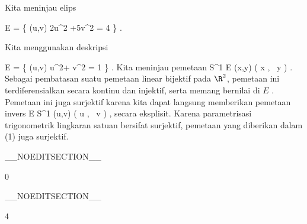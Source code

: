 {

Kita meninjau elips

\mavergleichskettedisp
{\vergleichskette
{ E
}
{ =} { \left\{ (u,v)  \mid   2u^2 +5v^2 = 4         \right\}
}
{ } {
}
{ } {
}
{ } {
}
}
{}{}{.}

}
{

Kita menggunakan deskripsi

\mavergleichskettedisp
{\vergleichskette
{ E
}
{ =} { \left\{ (u,v)   u^2+ {  } v^2 = 1         \right\}
}
{ } {
}
{ } {
}
{ } {
}
}
{}{}{.}
 {Kita meninjau pemetaan
\maabbeledisp {} {S^1} {E
} {(x,y)} { \left(   x  , \,   {  } y                   \right)
} {.}
Sebagai pembatasan suatu pemetaan linear bijektif pada $\R^2$, pemetaan ini terdiferensialkan secara kontinu dan injektif, serta memang bernilai di $E$
 {} {.}
Pemetaan ini juga surjektif karena kita dapat langsung memberikan pemetaan invers
\maabbeledisp {} { E } {S^1
} {(u,v)} { \left(  {  } u  , \,   {  } v                   \right)
} {,}
secara eksplisit. Karena parametrisasi trigonometrik lingkaran satuan bersifat surjektif, pemetaan yang diberikan dalam (1) juga surjektif.
}

 }

__NOEDITSECTION__

{0}

{

}
{  }

__NOEDITSECTION__

{4}

